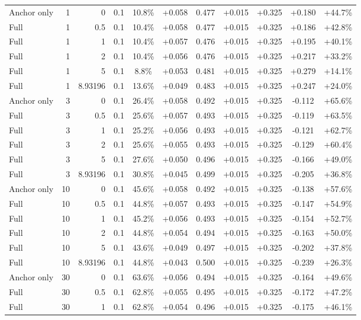 \begin{table}[htbp]
\begin{tabular}{lrrrccccccc}
Anchor only & 1 & 0 & 0.1 & 10.8\% & +0.058 & 0.477 & +0.015 & +0.325 & +0.180 & +44.7\% \\
Full & 1 & 0.5 & 0.1 & 10.4\% & +0.058 & 0.477 & +0.015 & +0.325 & +0.186 & +42.8\% \\
Full & 1 & 1 & 0.1 & 10.4\% & +0.057 & 0.476 & +0.015 & +0.325 & +0.195 & +40.1\% \\
Full & 1 & 2 & 0.1 & 10.4\% & +0.056 & 0.476 & +0.015 & +0.325 & +0.217 & +33.2\% \\
Full & 1 & 5 & 0.1 & 8.8\% & +0.053 & 0.481 & +0.015 & +0.325 & +0.279 & +14.1\% \\
Full & 1 & 8.93196 & 0.1 & 13.6\% & +0.049 & 0.483 & +0.015 & +0.325 & +0.247 & +24.0\% \\
Anchor only & 3 & 0 & 0.1 & 26.4\% & +0.058 & 0.492 & +0.015 & +0.325 & -0.112 & +65.6\% \\
Full & 3 & 0.5 & 0.1 & 25.6\% & +0.057 & 0.493 & +0.015 & +0.325 & -0.119 & +63.5\% \\
Full & 3 & 1 & 0.1 & 25.2\% & +0.056 & 0.493 & +0.015 & +0.325 & -0.121 & +62.7\% \\
Full & 3 & 2 & 0.1 & 25.6\% & +0.055 & 0.493 & +0.015 & +0.325 & -0.129 & +60.4\% \\
Full & 3 & 5 & 0.1 & 27.6\% & +0.050 & 0.496 & +0.015 & +0.325 & -0.166 & +49.0\% \\
Full & 3 & 8.93196 & 0.1 & 30.8\% & +0.045 & 0.499 & +0.015 & +0.325 & -0.205 & +36.8\% \\
Anchor only & 10 & 0 & 0.1 & 45.6\% & +0.058 & 0.492 & +0.015 & +0.325 & -0.138 & +57.6\% \\
Full & 10 & 0.5 & 0.1 & 44.8\% & +0.057 & 0.493 & +0.015 & +0.325 & -0.147 & +54.9\% \\
Full & 10 & 1 & 0.1 & 45.2\% & +0.056 & 0.493 & +0.015 & +0.325 & -0.154 & +52.7\% \\
Full & 10 & 2 & 0.1 & 44.8\% & +0.054 & 0.494 & +0.015 & +0.325 & -0.163 & +50.0\% \\
Full & 10 & 5 & 0.1 & 43.6\% & +0.049 & 0.497 & +0.015 & +0.325 & -0.202 & +37.8\% \\
Full & 10 & 8.93196 & 0.1 & 44.8\% & +0.043 & 0.500 & +0.015 & +0.325 & -0.239 & +26.3\% \\
Anchor only & 30 & 0 & 0.1 & 63.6\% & +0.056 & 0.494 & +0.015 & +0.325 & -0.164 & +49.6\% \\
Full & 30 & 0.5 & 0.1 & 62.8\% & +0.055 & 0.495 & +0.015 & +0.325 & -0.172 & +47.2\% \\
Full & 30 & 1 & 0.1 & 62.8\% & +0.054 & 0.496 & +0.015 & +0.325 & -0.175 & +46.1\% \\

\end{tabular}
\end{table}

